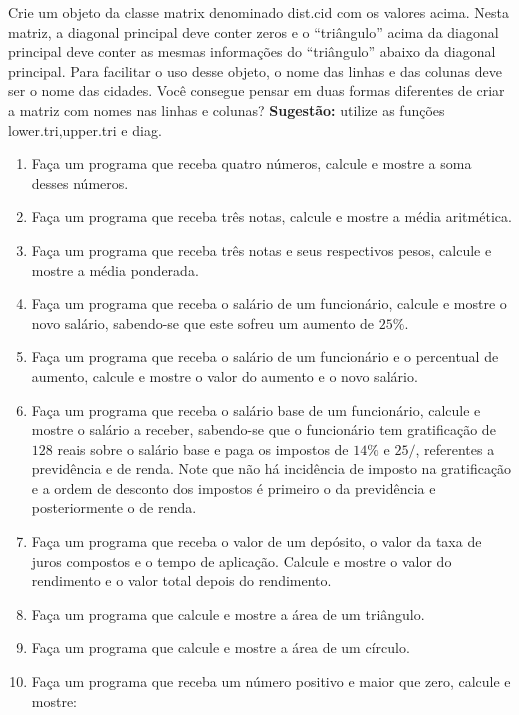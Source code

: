\documentclass[
]{article}
\begin{document}
Crie um objeto da classe matrix denominado dist.cid com os valores
acima. Nesta matriz, a diagonal principal deve conter zeros e o
``triângulo'' acima da diagonal principal deve conter as mesmas
informações do ``triângulo'' abaixo da diagonal principal. Para
facilitar o uso desse objeto, o nome das linhas e das colunas deve ser o
nome das cidades. Você consegue pensar em duas formas diferentes de
criar a matriz com nomes nas linhas e colunas? \textbf{Sugestão:}
utilize as funções lower.tri,upper.tri e diag.

\begin{enumerate}
\def\labelenumi{\arabic{enumi}.}
\setcounter{enumi}{18}
\item
  Faça um programa que receba quatro números, calcule e mostre a soma
  desses números.
\item
  Faça um programa que receba três notas, calcule e mostre a média
  aritmética.
\item
  Faça um programa que receba três notas e seus respectivos pesos,
  calcule e mostre a média ponderada.
\item
  Faça um programa que receba o salário de um funcionário, calcule e
  mostre o novo salário, sabendo-se que este sofreu um aumento de
  \(25\%\).
\item
  Faça um programa que receba o salário de um funcionário e o percentual
  de aumento, calcule e mostre o valor do aumento e o novo salário.
\item
  Faça um programa que receba o salário base de um funcionário, calcule
  e mostre o salário a receber, sabendo-se que o funcionário tem
  gratificação de \(128\) reais sobre o salário base e paga os impostos
  de \(14\%\) e \(25/%
  \), referentes a previdência e de renda. Note que não há incidência de
  imposto na gratificação e a ordem de desconto dos impostos é primeiro
  o da previdência e posteriormente o de renda.
\item
  Faça um programa que receba o valor de um depósito, o valor da taxa de
  juros compostos e o tempo de aplicação. Calcule e mostre o valor do
  rendimento e o valor total depois do rendimento.
\item
  Faça um programa que calcule e mostre a área de um triângulo.
\item
  Faça um programa que calcule e mostre a área de um círculo.
\item
  Faça um programa que receba um número positivo e maior que zero,
  calcule e mostre:


\end{enumerate}
\end{document}
